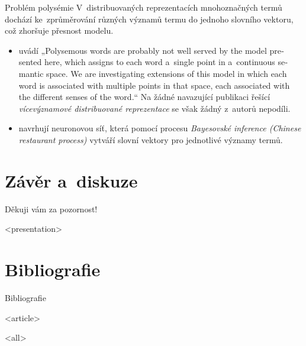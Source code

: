 \begin{frame}{Problém polysémie}
V~distribuovaných reprezentacích mnohoznačných termů dochází ke~zprůměrování
různých významů termu do jednoho slovního vektoru, což zhoršuje přesnost
modelu.

\pause

\begin{itemize}[<+->]
\item\textcite[sekce 5]{bengio03} uvádí „\foreignlanguage{english}{Polysemous words
are probably not well served by the model presented here, which assigns to each
word a~single point in a~continuous semantic space. We are investigating
extensions of this model in which each word is associated with multiple points
in that space, each associated with the different senses of the word.}“ Na
žádné navazující publikaci řešící \emph{vícevýznamové distribuované
reprezentace} se však
žádný z~autorů nepodíli.
\item\textcite{li15} navrhují neuronovou síť, která pomocí procesu \emph{Bayesovské
  inference (Chinese restaurant process)}
   vytváří slovní vektory pro jednotlivé významy termů.
\end{itemize}
\end{frame}

\section{Závěr a~diskuze}

\begin{frame}[plain]
\vfill
\centerline{Děkuji vám za pozornost!}
\vfill\vfill
\end{frame}

\mode
<presentation>

\section{Bibliografie}

\begin{frame}[allowframebreaks]{Bibliografie}
\printbibliography
\end{frame}

\mode
<article>

\printbibliography

\printindex

\mode
<all>
